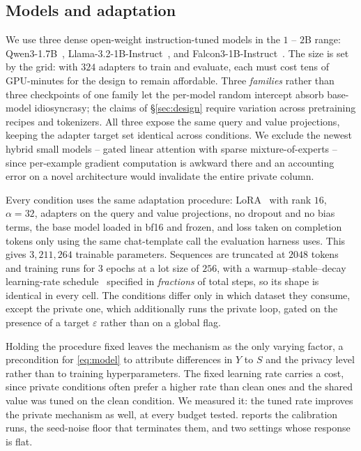 \subsection{Models and adaptation}
We use three dense open-weight instruction-tuned models in the $1$ -- $2$B range:
Qwen3-1.7B~\citep{yang2025qwen3},
Llama-3.2-1B-Instruct~\citep{grattafiori2024llama},
and Falcon3-1B-Instruct~\citep{falcon3}.
The size is set by the grid:
with $324$ adapters to train and evaluate,
each must cost tens of GPU-minutes for the design to remain affordable.
Three \textit{families} rather than three checkpoints of one family let the per-model random intercept absorb base-model idiosyncrasy;
the claims of \S\ref{sec:design} require variation across pretraining recipes and tokenizers.
All three expose the same query and value projections,
keeping the adapter target set identical across conditions.
We exclude the newest hybrid small models -- gated linear attention with sparse mixture-of-experts -- since per-example gradient computation is awkward there and an accounting error on a novel architecture would invalidate the entire private column.

Every condition uses the same adaptation procedure:
LoRA~\citep{hu2022lora} with rank $16$,
$\alpha = 32$,
adapters on the query and value projections,
no dropout and no bias terms,
the base model loaded in bf16 and frozen,
and loss taken on completion tokens only using the same chat-template call the evaluation harness uses.
This gives $3{,}211{,}264$ trainable parameters.
Sequences are truncated at $2048$ tokens and training runs for $3$ epochs at a lot size of $256$,
with a warmup--stable--decay learning-rate schedule~\citep{hu2024minicpm} specified in \textit{fractions} of total steps,
so its shape is identical in every cell.
The conditions differ only in which dataset they consume,
except the private one,
which additionally runs the private loop,
gated on the presence of a target $\varepsilon$ rather than on a global flag.

Holding the procedure fixed leaves the mechanism as the only varying factor,
a precondition for \eqref{eq:model} to attribute differences in $Y$ to $S$ and the privacy level rather than to training hyperparameters.
The fixed learning rate carries a cost,
since private conditions often prefer a higher rate than clean ones and the shared value was tuned on the clean condition.
We measured it:
the tuned rate improves the private mechanism as well,
at every budget tested.
 reports the calibration runs,
the seed-noise floor that terminates them,
and two settings whose response is flat.


